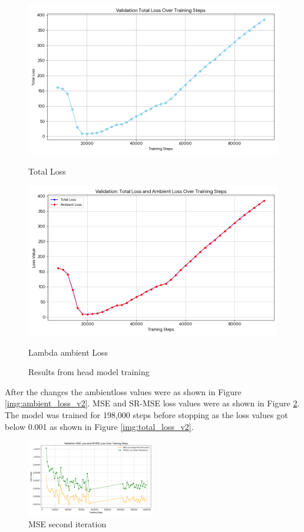 \documentclass[12pt]{article}
\begin{document}
\begin{figure}[h!]
    \centering
    \begin{minipage}{0.45\textwidth}
        \centering
        \includegraphics[width=0.8\linewidth]{images/training_loss.png}
        \caption{Total Loss}
        \label{fig:training_loss}
    \end{minipage}\hfill
    \begin{minipage}{0.45\textwidth}
        \centering
        \includegraphics[width=0.8\linewidth]{images/lambda_ambient_loss.png}
        \caption{Lambda ambient Loss}
        \label{fig:lambda_ambient_loss}
    \end{minipage}
    \caption{Results from head model training}
    \label{fig:first-head-training}
\end{figure}

After the changes the ambientloss values were as shown in Figure \ref{img:ambient_loss_v2}. MSE and SR-MSE loss values were as shown in Figure \ref{img:MSE_v2}. The model was trained for 198,000 steps before stopping as the loss values got below 0.001 as shown in Figure \ref{img:total_loss_v2}.

\begin{figure}[h!]
    \centering
    \includegraphics[width=0.5\textwidth]{images/MSE_v2.png}
    \caption{MSE second iteration}
    \label{img:MSE_v2}
\end{figure}
\end{document}
